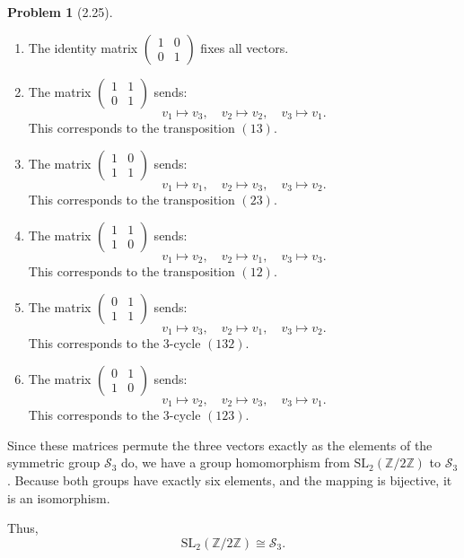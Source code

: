 \documentclass[12pt]{article}
\theoremstyle{definition}
\newtheorem{problem}{Problem}
\begin{document}
\begin{problem}[2.25]
\begin{enumerate}[label=(\alph*)]
\begin{solution}
            \begin{enumerate}[label=(\roman*)]
                \item The identity matrix $\begin{pmatrix} 1 & 0 \\ 0 & 1 \end{pmatrix}$ fixes all vectors.
                \item The matrix $\begin{pmatrix} 1 & 1 \\ 0 & 1 \end{pmatrix}$ sends:
                \[
                v_1 \mapsto v_3, \quad v_2 \mapsto v_2, \quad v_3 \mapsto v_1.
                \]
                This corresponds to the transposition $(13)$.
                \item The matrix $\begin{pmatrix} 1 & 0 \\ 1 & 1 \end{pmatrix}$ sends:
                \[
                v_1 \mapsto v_1, \quad v_2 \mapsto v_3, \quad v_3 \mapsto v_2.
                \]
                This corresponds to the transposition $(23)$.
                \item The matrix $\begin{pmatrix} 1 & 1 \\ 1 & 0 \end{pmatrix}$ sends:
                \[
                v_1 \mapsto v_2, \quad v_2 \mapsto v_1, \quad v_3 \mapsto v_3.
                \]
                This corresponds to the transposition $(12)$.
                \item The matrix $\begin{pmatrix} 0 & 1 \\ 1 & 1 \end{pmatrix}$ sends:
                \[
                v_1 \mapsto v_3, \quad v_2 \mapsto v_1, \quad v_3 \mapsto v_2.
                \]
                This corresponds to the 3-cycle $(132)$.
                \item The matrix $\begin{pmatrix} 0 & 1 \\ 1 & 0 \end{pmatrix}$ sends:
                \[
                v_1 \mapsto v_2, \quad v_2 \mapsto v_3, \quad v_3 \mapsto v_1.
                \]
                This corresponds to the 3-cycle $(123)$.
            \end{enumerate}
    
            Since these matrices permute the three vectors exactly as the elements of the symmetric group $\mathcal{S}_3$ do, we have a group homomorphism from $\text{SL}_2(\mathbb{Z}/2\mathbb{Z})$ to $\mathcal{S}_3$. Because both groups have exactly six elements, and the mapping is bijective, it is an isomorphism.
    
            Thus,
            \[
            \text{SL}_2(\mathbb{Z}/2\mathbb{Z}) \cong \mathcal{S}_3.
            \]
        \end{solution}
    \end{enumerate}
\end{problem}
\end{document}
